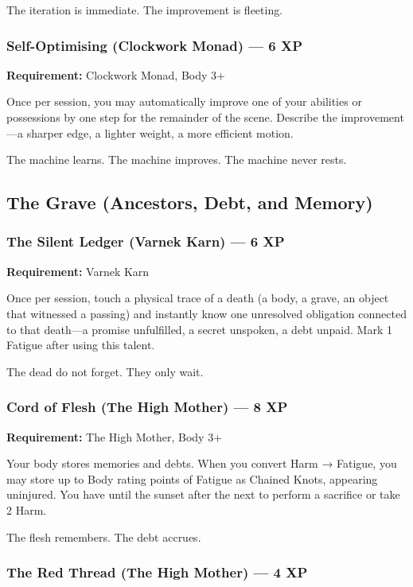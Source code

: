 The iteration is immediate. The improvement is fleeting.

\subsubsection{Self-Optimising (Clockwork Monad) — 6 XP}

\textbf{Requirement:} Clockwork Monad, Body 3+

Once per session, you may automatically improve one of your abilities or possessions by one step for the remainder of the scene. Describe the improvement—a sharper edge, a lighter weight, a more efficient motion.

The machine learns. The machine improves. The machine never rests.

\subsection{The Grave (Ancestors, Debt, and Memory)}

\subsubsection{The Silent Ledger (Varnek Karn) — 6 XP}

\textbf{Requirement:} Varnek Karn

Once per session, touch a physical trace of a death (a body, a grave, an object that witnessed a passing) and instantly know one unresolved obligation connected to that death—a promise unfulfilled, a secret unspoken, a debt unpaid. Mark 1 Fatigue after using this talent.

The dead do not forget. They only wait.

\subsubsection{Cord of Flesh (The High Mother) — 8 XP}

\textbf{Requirement:} The High Mother, Body 3+

Your body stores memories and debts. When you convert Harm → Fatigue, you may store up to Body rating points of Fatigue as Chained Knots, appearing uninjured. You have until the sunset after the next to perform a sacrifice or take 2 Harm.

The flesh remembers. The debt accrues.

\subsubsection{The Red Thread (The High Mother) — 4 XP}

